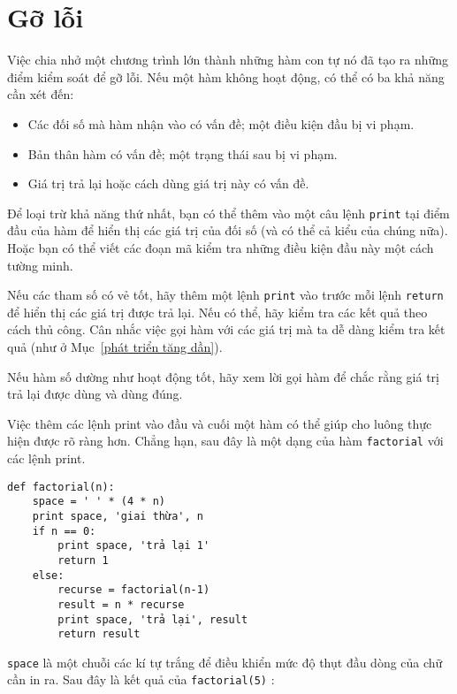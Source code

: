\documentclass[11pt]{book}
\begin{document}
\section{Gỡ lỗi}
\label{factdebug}


Việc chia nhở một chương trình lớn thành những hàm con tự nó đã tạo ra
những điểm kiểm soát để gỡ lỗi. Nếu một hàm không hoạt động, 
có thể có ba khả năng cần xét đến:

\begin{itemize}

\item Các đối số mà hàm nhận vào có vấn đề; một điều kiện đầu 
bị vi phạm.

\item Bản thân hàm có vấn đề; một trạng thái sau bị vi phạm.

\item Giá trị trả lại hoặc cách dùng giá trị này có vấn đề.

\end{itemize}

Để loại trừ khả năng thứ nhất, bạn có thể thêm vào một câu lệnh {\tt print}
tại điểm đầu của hàm để hiển thị các giá trị của đối số (và có thể cả kiểu
của chúng nữa). Hoặc bạn có thể viết các đoạn mã kiểm tra những điều
kiện đầu này một cách tường minh.


Nếu các tham số có vẻ tốt, hãy thêm một lệnh {\tt print} vào trước mỗi
lệnh {\tt return} để hiển thị các giá trị được trả lại. Nếu có thể, hãy kiểm
tra các kết quả theo cách thủ công. Cân nhắc việc gọi hàm với các giá trị
mà ta dễ dàng kiểm tra kết quả (như ở Mục~\ref{phát triển tăng dần}).

Nếu hàm số dường như hoạt động tốt, hãy xem lời gọi hàm để chắc rằng
giá trị trả lại được dùng và dùng đúng.


Việc thêm các lệnh print vào đầu và cuối một hàm có thể giúp cho
luông thực hiện được rõ ràng hơn. Chẳng hạn, sau đây là một dạng của
hàm {\tt factorial} với các lệnh print.

\beforeverb
\begin{verbatim}
def factorial(n):
    space = ' ' * (4 * n)
    print space, 'giai thừa', n
    if n == 0:
        print space, 'trả lại 1'
        return 1
    else:
        recurse = factorial(n-1)
        result = n * recurse
        print space, 'trả lại', result
        return result
\end{verbatim}
\afterverb
%
{\tt space} là một chuỗi các kí tự trắng để điều khiển
mức độ thụt đầu dòng của chữ cần in ra. Sau đây là 
kết quả của {\tt factorial(5)} :
\end{document}
